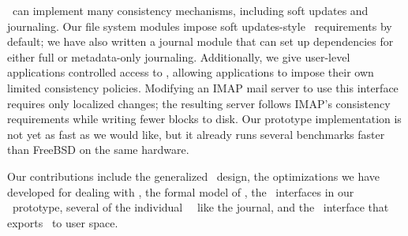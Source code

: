\Patches\ can implement many consistency mechanisms, including
 soft updates and journaling.
%
Our file system modules impose soft updates-style \patch\
 requirements by default; we have also written a journal module that
 can set up dependencies for either full or metadata-only journaling. 
%
Additionally, we give user-level applications controlled access to \patches,
allowing applications to impose their own limited consistency
 policies.
%
Modifying an IMAP mail server to use this interface requires only localized
 changes; the resulting server follows IMAP's consistency
 requirements while writing fewer blocks to disk.
%
Our prototype implementation is not yet as fast as we would like, but it
 already runs several benchmarks faster than FreeBSD on the same hardware.

\begin{comment}
 not ACID transactions: transactions should be independent, but any file
 system client can observe all active \patches), we believe that using
 \patches\ will allow the construction of consistent, modular, extensible
 file systems that are much easier to understand.
\end{comment}


Our contributions include the generalized \patch\ design, the
 optimizations we have developed for dealing with \patches, the formal
 model of \patches, the \module\ interfaces in our \Kudos\ prototype,
 several of the individual \Kudos\ \modules\ like the journal, and the
 \patchgroup\ interface that exports \patches\ to user space.


